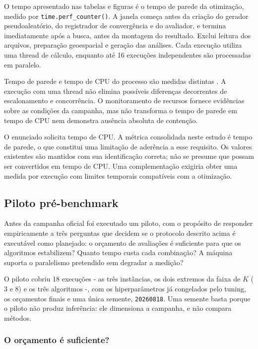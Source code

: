 \documentclass[12pt,a4paper]{article}
\begin{document}
O tempo apresentado nas tabelas e figuras é o tempo de parede da otimização, medido por
\texttt{time.perf\_counter()}. A janela começa antes da criação do gerador
pseudoaleatório, do registrador de convergência e do avaliador, e termina imediatamente
após a busca, antes da montagem do resultado. Exclui leitura dos arquivos, preparação
geoespacial e geração das análises. Cada execução utiliza uma thread de cálculo,
enquanto até 16 execuções independentes são processadas em paralelo.

Tempo de parede e tempo de CPU do processo são medidas distintas \cite{pythontime}. A execução com uma
thread não elimina possíveis diferenças decorrentes de escalonamento e concorrência. O
monitoramento de recursos fornece evidências sobre as condições da campanha, mas não
transforma o tempo de parede em tempo de CPU nem demonstra ausência absoluta de
contenção.

O enunciado solicita tempo de CPU. A métrica consolidada neste estudo é tempo de parede,
o que constitui uma limitação de aderência a esse requisito. Os valores existentes são
mantidos com sua identificação correta; não se presume que possam ser convertidos em
tempo de CPU. Uma complementação exigiria obter uma medida por execução com limites
temporais compatíveis com a otimização.

\subsection{Piloto pré-benchmark}
\label{sec:piloto}

Antes da campanha oficial foi executado um piloto, com o propósito de
responder empiricamente a três perguntas que decidem se o protocolo
descrito acima é executável como planejado: o orçamento de avaliações é
suficiente para que os algoritmos estabilizem? Quanto tempo custa cada
combinação? A máquina suporta o paralelismo pretendido sem degradar a
medição?

O piloto cobriu 18 execuções - as três instâncias, os dois extremos da
faixa de $K$ ($3$ e $8$) e os três algoritmos -, com os
hiperparâmetros já congelados pelo tuning, os orçamentos finais e uma
única semente, \texttt{20260818}. Uma semente basta porque o piloto não produz
inferência: ele dimensiona a campanha, e não compara métodos.

\subsubsection*{O orçamento é suficiente?}
\end{document}
